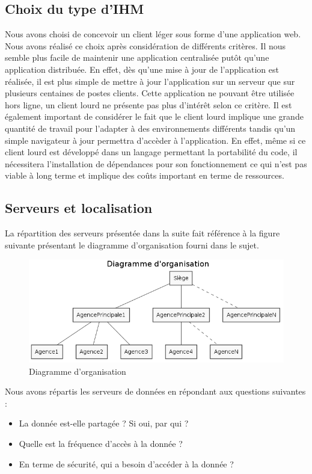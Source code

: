 \subsection{Choix du type d'IHM}

Nous avons choisi de concevoir un client léger sous forme d'une application web. Nous avons réalisé ce choix après considération de différents critères. Il nous semble plus facile de maintenir une application centralisée putôt qu'une application distribuée. En effet, dès qu'une mise à jour de l'application est réalisée, il est plus simple de mettre à jour l'application sur un serveur que sur plusieurs centaines de postes clients. Cette application ne pouvant être utilisée hors ligne, un client lourd ne présente pas plus d'intérêt selon ce critère. Il est également important de considérer le fait que le client lourd implique une grande quantité de travail pour l'adapter à des environnements différents tandis qu'un simple navigateur à jour permettra d'accèder à l'application. En effet, même si ce client lourd est développé dans un langage permettant la portabilité du code, il nécessitera l'installation de dépendances pour son fonctionnement ce qui n'est pas viable à long terme et implique des coûts important en terme de ressources. 

\subsection{Serveurs et localisation}

La répartition des serveurs présentée dans la suite fait référence à la figure suivante présentant le diagramme d'organisation fourni dans le sujet.

\begin{figure}[H]
	\includegraphics[scale=0.6]{figures/DO.png}
	\caption{Diagramme d'organisation}
\end{figure}

Nous avons répartis les serveurs de données en répondant aux questions suivantes :\\
\begin{itemize}
	\item[\textbullet] La donnée est-elle partagée ? Si oui, par qui ?
	\item[\textbullet] Quelle est la fréquence d'accès à la donnée ?
	\item[\textbullet] En terme de sécurité, qui a besoin d'accéder à la donnée ?\\
\end{itemize}

